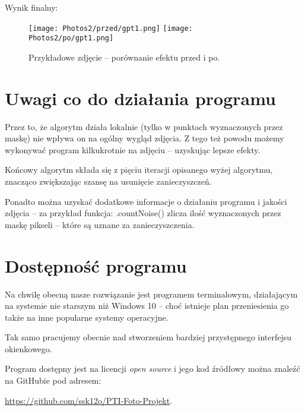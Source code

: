 \documentclass[]{mwart}
\begin{document}
Wynik finalny:
\begin{figure}[H]
    \centering
    \texttt{[image: Photos2/przed/gpt1.png]}
    \texttt{[image: Photos2/po/gpt1.png]}
    \caption{Przykładowe zdjęcie -- porównanie efektu przed i po.}

\end{figure}

\newpage
\section{Uwagi co do działania programu}
Przez to, że algorytm działa lokalnie (tylko w punktach wyznaczonych
przez maskę) nie wpływa on na ogólny wygląd zdjęcia.
Z tego też powodu możemy wykonywać program kilkukrotnie na zdjęciu
-- uzyskując lepsze efekty.

Końcowy algorytm składa się z pięciu iteracji opisanego wyżej algorytmu,
znacząco zwiększając szansę na usunięcie zanieczyszczeń.

Ponadto można uzyskać dodatkowe informacje o działaniu programu
i jakości zdjęcia -- za przykład funkcja: .countNoise()
zlicza ilość wyznaczonych przez maskę pikseli -- które są uznane za zanieczyszczenia.





\section{Dostępność programu}
Na chwilę obecną nasze rozwiązanie jest programem terminalowym,
działającym na systemie nie starszym niż Windows 10 -- choć istnieje
plan przeniesienia go także na inne popularne systemy operacyjne.

Tak samo pracujemy obecnie nad stworzeniem bardziej przystępnego interfejsu okienkowego.

Program dostępny jest na licencji \textit{open source} i jego kod źródłowy można znaleźć na GitHubie
pod adresem:
\begin{center}
    \url{https://github.com/ssk12o/PTI-Foto-Projekt}.
\end{center}




\newpage
\end{document}
